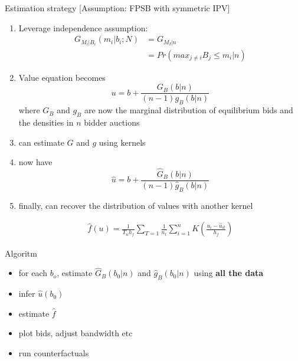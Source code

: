 \begin{frame}[allowframebreaks]{Estimation strategy}
  [Assumption: FPSB with symmetric IPV]

  \begin{enumerate}
    \item Leverage independence assumption: 
    \begin{align*}  
      G_{M_i | B_i}(m_i | b_i; N) &= G_{M_I | n} \\
                                  &= Pr(max_{j\neq i} B_j \leq m_i | n )      
    \end{align*}  
    \item Value equation becomes 
    $$ u = b + \frac{G_B \left(b | n \right)}{ (n-1) g_B \left(b | n \right)} $$
    where $G_B$ and $g_B$ are now the marginal distribution of equilibrium bids and the densities in $n$ bidder auctions

    \framebreak
    
    \item can estimate $G$ and $g$ using kernels 


    \item now have 
    $$ \hat u = b + \frac{\hat G_B \left(b | n \right)}{ (n-1) \hat g_B \left(b | n \right)} $$

    \item finally, can recover the distribution of values with another kernel 
    
    \begin{eqnarray*}
      \hat{f}(u) = \frac{1}{T_nh_f} \sum_{T=1}\frac{1}{n_t}\sum_{i=1}^{n}  K \left( \frac{u_i - \hat u_{it}}{h_f} \right)
    \end{eqnarray*}

  \end{enumerate}

\end{frame}  



\begin{frame}{Algoritm}
\begin{itemize}
   \item for each $b_o$, estimate $\hat G_B(b_0|n)$ and $\hat g_B(b_0|n)$ using \textbf{all the data}
   \item infer $\hat u(b_0)$
   \item estimate $\hat f$ 
   \item plot bids, adjust bandwidth etc 
   \item run counterfactuals 
\end{itemize}
\end{frame}



